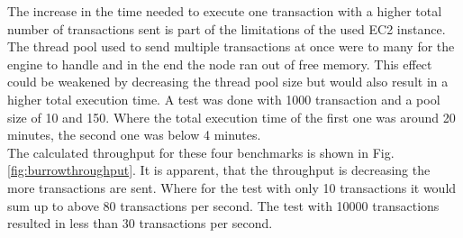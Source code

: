 \begin{minipage}{\linewidth}
   \label{fig:burrowtxs}
\end{minipage}

The increase in the time needed to execute one transaction with a higher total number of transactions sent is part of the
limitations of the used EC2 instance. The thread pool used to send multiple transactions at once were to many for the engine
to handle and in the end the node ran out of free memory. This effect could be weakened by decreasing the thread pool size
but would also result in a higher total execution time. A test was done with 1000 transaction and a pool size of 10 and 150.
Where the total execution time of the first one was around 20 minutes, the second one was below 4 minutes. \\[5mm]

The calculated throughput for these four benchmarks is shown in Fig. \ref{fig:burrowthroughput}. It is apparent, that the throughput
is decreasing the more transactions are sent. Where for the test with only 10 transactions it would sum up to above 80 transactions per second.
The test with 10000 transactions resulted in less than 30 transactions per second.

\begin{minipage}{\linewidth}
   \label{fig:burrowthroughput}
\end{minipage}

